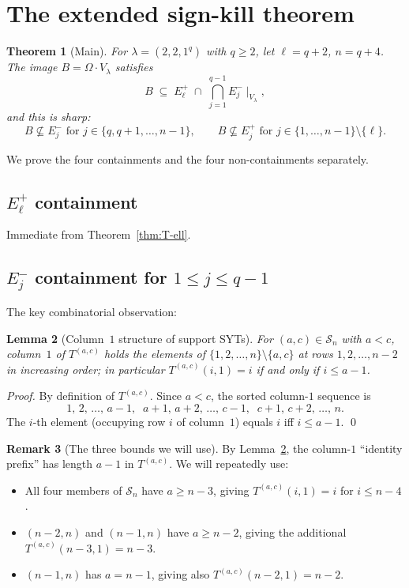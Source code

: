 \documentclass[11pt]{article}
\newtheorem{theorem}{Theorem}
\newtheorem{lemma}[theorem]{Lemma}
\theoremstyle{definition}
\newtheorem{remark}[theorem]{Remark}
\newcommand{\Vlam}{V_\lambda}
\newcommand{\Om}{\Omega}
\begin{document}
\section{The extended sign-kill theorem}\label{sec:main}

\begin{theorem}[Main]\label{thm:main}
For $\lambda = (2,2,1^q)$ with $q \ge 2$, let $\ell = q+2$, $n = q+4$.
The image $B = \Om\cdot\Vlam$ satisfies
\[
   B \;\subseteq\; E_\ell^+\;\cap\; \bigcap_{j=1}^{q-1} E_j^-\!\mid_{\Vlam},
\]
and this is sharp:
\[
   B \not\subseteq E_j^- \text{ for } j \in \{q, q+1, \ldots, n-1\},
   \qquad
   B \not\subseteq E_j^+ \text{ for } j \in \{1,\ldots,n-1\}\setminus\{\ell\}.
\]
\end{theorem}

We prove the four containments and the four non-containments
separately.

\subsection{$E_\ell^+$ containment}

Immediate from Theorem~\ref{thm:T-ell}.

\subsection{$E_j^-$ containment for $1 \le j \le q-1$}

The key combinatorial observation:

\begin{lemma}[Column~$1$ structure of support SYTs]\label{lem:top-col1}
For $(a, c) \in \mathcal{S}_n$ with $a < c$, column~$1$ of $T^{(a,c)}$
holds the elements of $\{1, 2, \ldots, n\} \setminus \{a, c\}$ at rows
$1, 2, \ldots, n-2$ in increasing order; in particular
$T^{(a,c)}(i, 1) = i$ if and only if $i \le a-1$.
\end{lemma}

\begin{proof}
By definition of $T^{(a,c)}$.  Since $a < c$, the sorted column-$1$
sequence is
\[
   1,\, 2,\, \ldots,\, a-1,\;\; a+1,\, a+2,\, \ldots,\, c-1,\;\; c+1,\, c+2,\, \ldots,\, n.
\]
The $i$-th element (occupying row $i$ of column~$1$) equals $i$ iff
$i \le a-1$.
\qed
\end{proof}

\begin{remark}[The three bounds we will use]\label{rem:bounds}
By Lemma~\ref{lem:top-col1}, the column-$1$ ``identity prefix'' has
length $a - 1$ in $T^{(a,c)}$.  We will repeatedly use:
\begin{itemize}[topsep=0.2em,itemsep=0.1em]
\item All four members of $\mathcal{S}_n$ have $a \ge n - 3$,
  giving $T^{(a,c)}(i,1) = i$ for $i \le n - 4$.
\item $(n-2, n)$ and $(n-1, n)$ have $a \ge n - 2$, giving the
  additional $T^{(a,c)}(n-3, 1) = n-3$.
\item $(n-1, n)$ has $a = n - 1$, giving also $T^{(a,c)}(n-2, 1) = n-2$.
\end{itemize}
\end{remark}
\end{document}
